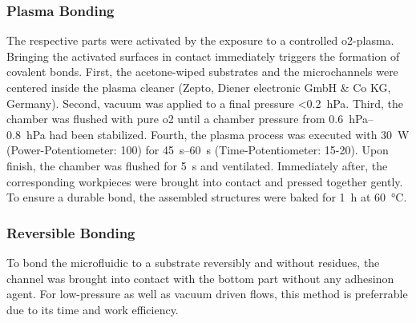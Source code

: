 \subsubsection{Plasma Bonding}
\label{sec:meth:bond:plasma}
The respective parts were activated by the exposure to a controlled \gls{o2}-plasma. Bringing the activated surfaces in contact immediately triggers the formation of covalent bonds. First, the acetone-wiped substrates and the microchannels were centered inside the plasma cleaner (Zepto, Diener electronic GmbH \& Co KG, Germany). Second, vacuum was applied to a final pressure <\SI{0.2}{\hecto\pascal}. Third, the chamber was flushed with pure \gls{o2} until a chamber pressure from \SIrange{0.6}{0.8}{\hecto\pascal} had been stabilized. Fourth, the plasma process was executed with \SI{30}{\watt} (Power-Potentiometer: 100) for \SIrange{45}{60}{\second} (Time-Potentiometer: 15-20). Upon finish, the chamber was flushed for \SI{5}{\second} and ventilated. Immediately after, the corresponding workpieces were brought into contact and pressed together gently. To ensure a durable bond, the assembled structures were baked for \SI{1}{\hour} at \SI{60}{\degreeCelsius}.
\subsubsection{Reversible Bonding}
To bond the microfluidic to a substrate reversibly and without residues, the channel was brought into contact with the bottom part without any adhesinon agent. For low-pressure as well as vacuum driven flows, this method is preferrable due to its time and work efficiency.
